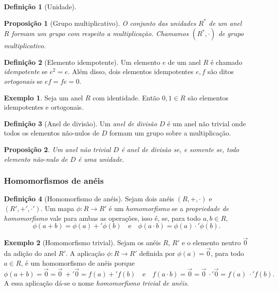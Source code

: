 \documentclass[a4paper,12pt]{report}
\theoremstyle{plain}
\newtheorem{proposicao}{Proposição}[section]
\theoremstyle{definition}
\newtheorem{definicao}{Definição}[section]
\newtheorem{exemplo}{Exemplo}[section]
\begin{document}
	\begin{definicao}[Unidade]
		
	\end{definicao}
	
	\begin{proposicao}[Grupo multiplicativo]
		O conjunto das unidades $R^*$ de um anel $R$ formam um grupo com respeito a multiplicação. Chamamos $(R^*,\cdot)$ de \emph{grupo multiplicativo}.
	\end{proposicao}
	
	\begin{definicao}[Elemento idempotente]
		Um elemento $e$ de um anel $R$ é chamado \emph{idempotente} se $e^2 = e$. Além disso, dois elementos idempotentes $e,f$ são ditos \emph{ortogonais} se $ef = fe = 0$.
	\end{definicao}
	
	\begin{exemplo}
		Seja um anel $R$ com identidade. Então $0,1 \in R$ são elementos idempotentes e ortogonais.
	\end{exemplo}
	
	\begin{definicao}[Anel de divisão]
		Um \emph{anel de divisão} $D$ é um anel não trivial onde todos os elementos não-nulos de $D$ formam um grupo sobre a multiplicação. 
	\end{definicao}
	
	\begin{proposicao}
		Um anel não trivial $D$ é anel de divisão se, e somente se, todo elemento não-nulo de $D$ é uma unidade.	
	\end{proposicao}
	
	\subsubsection{Homomorfismos de anéis}
	
	\begin{definicao}[Homomorfismo de anéis]
		Sejam dois anéis $(R, +, \cdot)$ e $(R', +', \cdot')$. Um mapa $\phi: R \longrightarrow R'$ é um \emph{homomorfismo} se a \emph{propriedade de homomorfismo} vale para ambas as operações, isso é, se, para todo $a,b\in R$,
		$$\phi(a+b) = \phi(a) +' \phi(b) \quad \text{e} \quad \phi(a\cdot b) = \phi(a) \cdot' \phi(b).$$
	\end{definicao}
	
	\begin{exemplo}[Homomorfismo trivial]
		Sejam os anéis $R$, $R'$ e o elemento neutro $\vec 0$ da adição do anel $R'$. A aplicação $\phi: R\longrightarrow R'$ definida por $\phi(a) = \vec 0$, para todo $a\in R$, é um homomorfismo de anéis porque $$\phi(a + b) = \vec 0 = \vec 0 \ +' \vec 0 = f(a) +' f(b) \quad \text{e} \quad f(a\cdot b) = \vec 0 = \vec 0 \ \cdot' \vec 0 = f(a)\ \cdot' f(b).$$
		A essa aplicação dá-se o nome \emph{homomorfismo trivial de anéis}.
	\end{exemplo}
	
\end{document}
